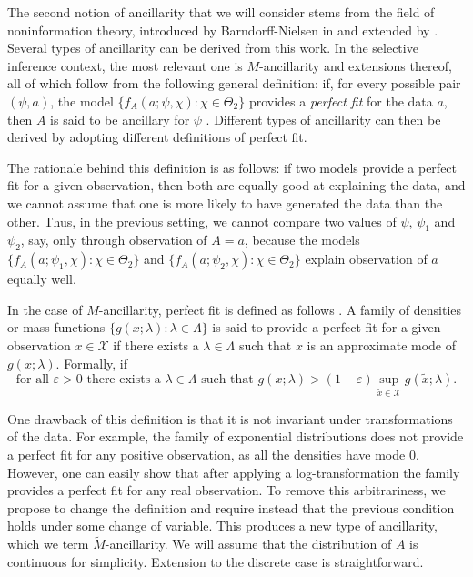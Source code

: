 \documentclass[pdflatex,sn-chicago]{sn-jnl}%
\theoremstyle{thmstyleone}%
\theoremstyle{thmstyletwo}%
\theoremstyle{thmstylethree}%
\begin{document}
The second notion of ancillarity that we will consider stems from the field of noninformation theory, introduced by Barndorff-Nielsen in \cite{bn2} and extended by \cite{jorgensen}. Several types of ancillarity can be derived from this work. In the selective inference context, the most relevant one is $M$-ancillarity and extensions thereof, all of which follow from the following general definition: if, for every possible pair $(\psi, a)$, the model $\{f_A(a; \psi, \chi) \colon \chi \in \Theta_2\}$ provides a \textit{perfect fit} for the data $a$, then $A$ is said to be ancillary for $\psi$ \citep{jorgensen}. Different types of ancillarity can then be derived by adopting different definitions of perfect fit. 

The rationale behind this definition is as follows: if two models provide a perfect fit for a given observation, then both are equally good at explaining the data, and we cannot assume that one is more likely to have generated the data than the other. Thus, in the previous setting, we cannot compare two values of $\psi$, $\psi_1$ and $\psi_2$, say, only through observation of $A = a$, because the models $\{f_A(a; \psi_1, \chi) \colon \chi \in \Theta_2\}$ and $\{f_A(a; \psi_2, \chi) \colon \chi \in \Theta_2\}$ explain observation of $a$ equally well.

In the case of $M$-ancillarity, perfect fit is defined as follows \citep{bn2}. A family of densities or mass functions $\{g(x; \lambda)\colon \lambda \in \Lambda\}$ is said to provide a perfect fit for a given observation $x\in \mathcal{X}$ if there exists a $\lambda\in \Lambda$ such that $x$ is an approximate mode of $g(x; \lambda)$. Formally, if
\begin{equation} \label{EQ: M_noninformation}
\text{for all } \varepsilon > 0 \text{ there exists a } \lambda\in \Lambda \text{ such that } g(x; \lambda) > (1 - \varepsilon) \sup_{\tilde x\in \mathcal{X}} g(\tilde x; \lambda).
\end{equation}

One drawback of this definition is that it is not invariant under transformations of the data. For example, the family of exponential distributions does not provide a perfect fit for any positive observation, as all the densities have mode $0$. However, one can easily show that after applying a log-transformation the family provides a perfect fit for any real observation. To remove this arbitrariness, we propose to change the definition and require instead that the previous condition holds under some change of variable. This produces a new type of ancillarity, which we term $\tilde{M}$-ancillarity. We will assume that the distribution of $A$ is continuous for simplicity. Extension to the discrete case is straightforward.
\end{document}
